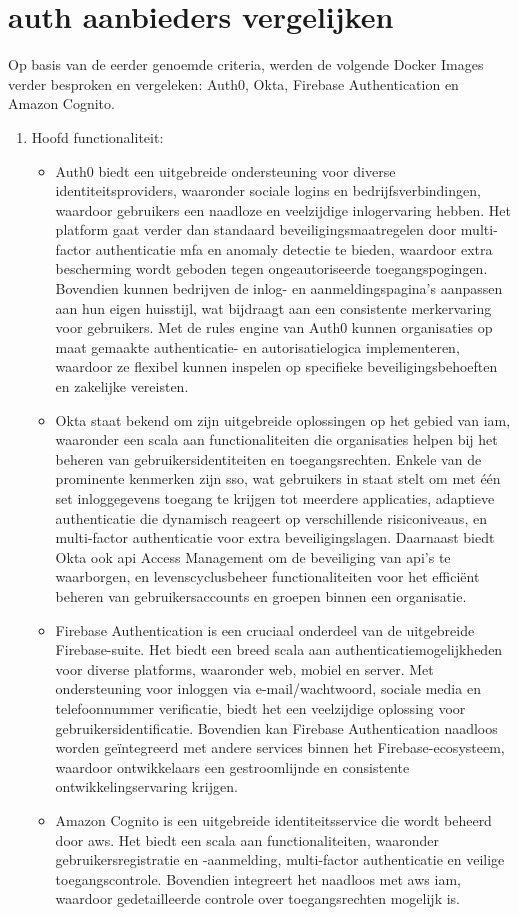 \section{\gls{auth} aanbieders vergelijken}%
\label{sec:auth-aanbieders-vergelijken}
Op basis van de eerder genoemde criteria, werden de volgende Docker Images verder besproken en vergeleken: Auth0, Okta, Firebase Authentication en Amazon Cognito.
\begin{enumerate}
  \item Hoofd functionaliteit:
  \begin{itemize}
    \item Auth0 biedt een uitgebreide ondersteuning voor diverse identiteitsproviders, waaronder sociale logins en bedrijfsverbindingen, waardoor gebruikers een naadloze en veelzijdige inlogervaring hebben. Het platform gaat verder dan standaard beveiligingsmaatregelen door multi-factor authenticatie \gls{mfa} en anomaly detectie te bieden, waardoor extra bescherming wordt geboden tegen ongeautoriseerde toegangspogingen. Bovendien kunnen bedrijven de inlog- en aanmeldingspagina's aanpassen aan hun eigen huisstijl, wat bijdraagt aan een consistente merkervaring voor gebruikers. Met de rules engine van Auth0 kunnen organisaties op maat gemaakte authenticatie- en autorisatielogica implementeren, waardoor ze flexibel kunnen inspelen op specifieke beveiligingsbehoeften en zakelijke vereisten.
    \item Okta staat bekend om zijn uitgebreide oplossingen op het gebied van \gls{iam}, waaronder een scala aan functionaliteiten die organisaties helpen bij het beheren van gebruikersidentiteiten en toegangsrechten. Enkele van de prominente kenmerken zijn \gls{sso}, wat gebruikers in staat stelt om met één set inloggegevens toegang te krijgen tot meerdere applicaties, adaptieve authenticatie die dynamisch reageert op verschillende risiconiveaus, en multi-factor authenticatie voor extra beveiligingslagen. Daarnaast biedt Okta ook \gls{api} Access Management om de beveiliging van \gls{api}'s te waarborgen, en levenscyclusbeheer functionaliteiten voor het efficiënt beheren van gebruikersaccounts en groepen binnen een organisatie.
    \item Firebase Authentication is een cruciaal onderdeel van de uitgebreide Firebase-suite. Het biedt een breed scala aan authenticatiemogelijkheden voor diverse platforms, waaronder web, mobiel en server. Met ondersteuning voor inloggen via e-mail/wachtwoord, sociale media en telefoonnummer verificatie, biedt het een veelzijdige oplossing voor gebruikersidentificatie. Bovendien kan Firebase Authentication naadloos worden geïntegreerd met andere services binnen het Firebase-ecosysteem, waardoor ontwikkelaars een gestroomlijnde en consistente ontwikkelingservaring krijgen.
    \item Amazon Cognito is een uitgebreide identiteitsservice die wordt beheerd door \gls{aws}. Het biedt een scala aan functionaliteiten, waaronder gebruikersregistratie en -aanmelding, multi-factor authenticatie en veilige toegangscontrole. Bovendien integreert het naadloos met \gls{aws} \gls{iam}, waardoor gedetailleerde controle over toegangsrechten mogelijk is.
  \end{itemize}
  

\end{enumerate}
